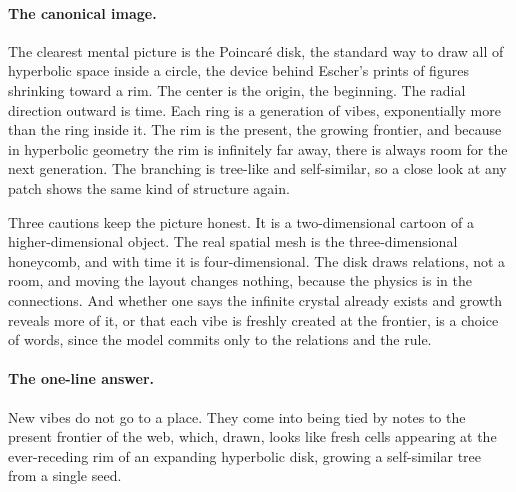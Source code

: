 \paragraph{The canonical image.}
The clearest mental picture is the Poincar\'e disk, the standard way to draw all of hyperbolic
space inside a circle, the device behind Escher's prints of figures shrinking toward a rim. The
center is the origin, the beginning. The radial direction outward is time. Each ring is a
generation of vibes, exponentially more than the ring inside it. The rim is the present, the
growing frontier, and because in hyperbolic geometry the rim is infinitely far away, there is
always room for the next generation. The branching is tree-like and self-similar, so a close
look at any patch shows the same kind of structure again.

Three cautions keep the picture honest. It is a two-dimensional cartoon of a higher-dimensional
object. The real spatial mesh is the three-dimensional honeycomb, and with time it is
four-dimensional. The disk draws relations, not a room, and moving the layout changes nothing,
because the physics is in the connections. And whether one says the infinite crystal already
exists and growth reveals more of it, or that each vibe is freshly created at the frontier, is
a choice of words, since the model commits only to the relations and the rule.

\paragraph{The one-line answer.}
New vibes do not go to a place. They come into being tied by notes to the present frontier of
the web, which, drawn, looks like fresh cells appearing at the ever-receding rim of an
expanding hyperbolic disk, growing a self-similar tree from a single seed.
